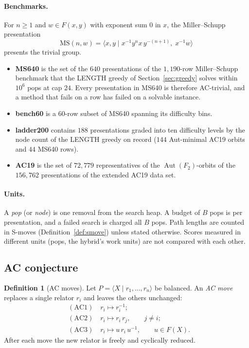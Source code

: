 \documentclass[11pt]{article}
\theoremstyle{definition}
\newtheorem{definition}[theorem]{Definition}
\theoremstyle{remark}
\newcommand{\F}{F}
\newcommand{\pres}[2]{\langle #1 \mid #2 \rangle}
\newcommand{\Aut}{\operatorname{Aut}}
\newcommand{\MS}{\mathrm{MS}}
\begin{document}
\paragraph{Benchmarks.} For $n\ge1$ and $w\in\F(x,y)$ with exponent sum $0$ in $x$, the Miller--Schupp presentation
\[
\MS(n,w)=\pres{x,y}{x^{-1}y^{n}x\,y^{-(n+1)},\;x^{-1}w}
\]
presents the trivial group.
\begin{itemize}
  \item \textbf{MS640} is the set of the $640$ presentations of the $1{,}190$-row Miller--Schupp benchmark that the
  LENGTH greedy of Section~\ref{sec:greedy} solves within $10^6$ pops at cap $24$. Every presentation in MS640 is
  therefore AC-trivial, and a method that fails on a row has failed on a solvable instance.
  \item \textbf{bench60} is a $60$-row subset of MS640 spanning its difficulty bins.
  \item \textbf{ladder200} contains $188$ presentations graded into ten difficulty levels by the node count of the
  LENGTH greedy on record ($144$ Aut-minimal AC19 orbits and $44$ MS640 rows).
  \item \textbf{AC19} is the set of $72{,}779$ representatives of the $\Aut(\F_2)$-orbits of the $156{,}762$
  presentations of the extended AC19 data set.
\end{itemize}

\paragraph{Units.} A \emph{pop} (or \emph{node}) is one removal from the search heap. A budget of $B$ pops is per
presentation, and a failed search is charged all $B$ pops. Path lengths are counted in S-moves
(Definition~\ref{def:smove}) unless stated otherwise. Scores measured in different units (pops, the hybrid's work units)
are not compared with each other.

\subsection{AC conjecture}

\begin{definition}[AC moves]\label{def:ac}
Let $P=\pres{X}{r_1,\dots,r_n}$ be balanced. An \emph{AC move} replaces a single relator $r_i$ and leaves the others
unchanged:
\begin{align*}
&(\mathrm{AC1})\quad r_i\mapsto r_i^{-1};\\
&(\mathrm{AC2})\quad r_i\mapsto r_i\,r_j,\qquad j\neq i;\\
&(\mathrm{AC3})\quad r_i\mapsto u\,r_i\,u^{-1},\qquad u\in\F(X).
\end{align*}
After each move the new relator is freely and cyclically reduced.
\end{definition}
\end{document}
